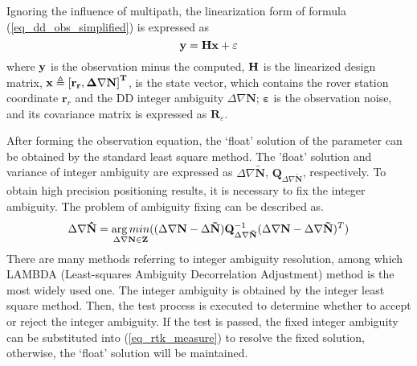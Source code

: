 \documentclass[final,3p,times]{elsarticle}
\begin{document}
	Ignoring the influence of multipath, the linearization form of formula (\ref{eq_dd_obs_simplified}) is expressed as
	\begin{equation}
	\label{eq_rtk_measure}
	{\bf{y}} = {\bf{Hx}} + {\bf{\varepsilon }}
	\end{equation}
	where $\bf{y}$ is the observation minus the computed,  $\bf{H} $ is the linearized design matrix\cite{hofmann-wellenhof2007gnss}, $\bf{x}\triangleq {{[{{\mathbf{r}}_{r}},\Delta \nabla \mathbf{N}]}^{T}}$, is the state vector, which contains the rover station coordinate ${{\mathbf{r}}_{r}}$ and the DD integer ambiguity $\Delta \nabla \mathbf{N}$;  $\mathbf{\varepsilon } $ is the observation noise, and its covariance matrix is expressed as  ${{\mathbf{R}}_{\varepsilon }} $. 
	
	After forming the observation equation, the ‘float’ solution of the parameter can be obtained by the standard least square method. 
	The 'float' solution and variance of integer ambiguity are expressed as  $\Delta \nabla \mathbf{\tilde{N}} $,  ${{\mathbf{Q}}_{\Delta \nabla \mathbf{\tilde{N}}}} $, respectively. 
	To obtain high precision positioning results, it is necessary to fix the integer ambiguity. 
	The problem of ambiguity fixing can be described as\cite{teunissen1995the}.
	\begin{equation}
	\Delta \nabla {\bf{\hat N}} = \mathop {\arg min}\limits_{\Delta \nabla {\bf{N}} \in {\bf{Z}}} ((\Delta \nabla {\bf{N}} - \Delta  {\bf{\tilde N}}){\bf{Q}}_{\Delta \nabla {\bf{\tilde N}}}^{ - 1}{(\Delta \nabla {\bf{N}} - \Delta \nabla {\bf{\tilde N}})^T})
	\label{eq_lamda}
	\end{equation}
	There are many methods referring to integer ambiguity resolution, among which LAMBDA (Least-squares Ambiguity Decorrelation Adjustment)\cite{teunissen1995the} method is the most widely used one. The integer ambiguity is obtained by the integer least square method. Then, the test process is executed to determine whether to accept or reject the integer ambiguity\cite{teunissen2003integer,teunissen2005gnss}. If the test is passed, the fixed integer ambiguity can be substituted into (\ref{eq_rtk_measure}) to resolve the fixed solution, otherwise, the ‘float’ solution will be maintained.
	
\end{document}
